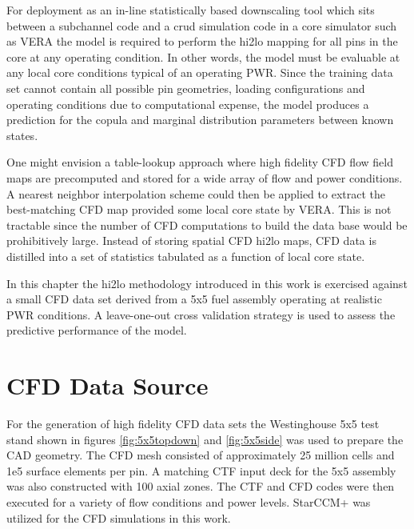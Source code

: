\label{sec:ml_cfd}

For deployment as an in-line statistically based downscaling tool which sits between a subchannel code and a crud simulation code in a core simulator such as VERA the model is required to perform the hi2lo mapping for all pins in the core at any operating condition.  In other words, the model must be evaluable at any local core conditions typical of an operating PWR.  Since the training data set cannot contain all possible pin geometries, loading configurations and operating conditions due to computational expense, the model produces a prediction for the copula and marginal distribution parameters between known states.

One might envision a table-lookup approach where high fidelity CFD flow field maps are precomputed and stored for a wide array of flow and power conditions.  A nearest neighbor interpolation scheme could then be applied to extract the best-matching CFD map provided some local core state by VERA.  This is not tractable since the number of CFD computations to build the data base would be prohibitively large.  Instead of storing spatial CFD hi2lo maps, CFD data is distilled into a set of statistics tabulated as a function of local core state.


In this chapter the hi2lo methodology introduced in this work is exercised against a small CFD data set derived from a 5x5 fuel assembly operating at realistic PWR conditions.  A leave-one-out cross validation strategy is used to assess the predictive performance of the model.


\section{CFD Data Source}
\label{sec:cfd_data_source}

For the generation of high fidelity CFD data sets the Westinghouse 5x5 test stand shown in figures \ref{fig:5x5topdown} and \ref{fig:5x5side} was used to prepare the CAD geometry.  The CFD mesh consisted of approximately 25 million cells and 1e5 surface elements per pin.  A matching CTF input deck for the 5x5 assembly was also constructed with 100 axial zones.  The CTF and CFD codes were then executed for a variety of flow conditions and power levels.  StarCCM+ was utilized for the CFD simulations in this work.


